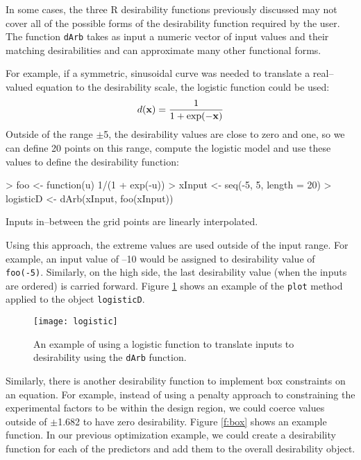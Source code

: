 \documentclass[12pt]{article}
\renewcommand{\vec}[1]{\mbox{\bf {#1}}}
\begin{document}
In some cases, the three R desirability functions previously discussed may not cover all of the possible forms of the desirability function required by the user. The function \texttt{dArb} takes as input a numeric vector of input values and their matching desirabilities and can approximate many other functional forms. 

For example, if a symmetric, sinusoidal curve was needed to translate a real--valued equation to the desirability scale, the logistic function could be used:
\[
d(\vec{x}) = \frac{1}{1+\exp(-\vec{x})}
\]
Outside of the range $\pm$5, the desirability values are close to zero and one, so we can define 20 points on this range, compute the logistic model and use these values to define the desirability function:

\begin{Schunk}
\begin{Sinput}
> foo <- function(u) 1/(1 + exp(-u))
> xInput <- seq(-5, 5, length = 20)
> logisticD <- dArb(xInput, foo(xInput))
\end{Sinput}
\end{Schunk}
Inputs in--between the grid points are linearly interpolated.

Using this approach, the extreme values are used outside of the input range. For example, an input value of --10 would be assigned to desirability value of \texttt{foo(-5)}. Similarly, on the high side, the last desirability value (when the inputs are ordered) is carried forward. Figure \ref{f:logistic} shows an example of the \texttt{plot} method applied to the object \texttt{logisticD}.

\begin{figure}[ht]
   \begin{center}	
      \texttt{[image: logistic]}  
      \caption{An example of using a logistic function to translate inputs to desirability using the \texttt{dArb} function.}
      \label{f:logistic}   
\end{center}	
\end{figure}


Similarly, there is another desirability function to implement box constraints on an equation. For example, instead of using a penalty approach to constraining the experimental factors to be within the design region, we could coerce values outside of $\pm$1.682 to have zero desirability. Figure \ref{f:box} shows an example function. In our previous optimization example, we could create a desirability function for each of the predictors and add them to the overall desirability object.
\end{document}
